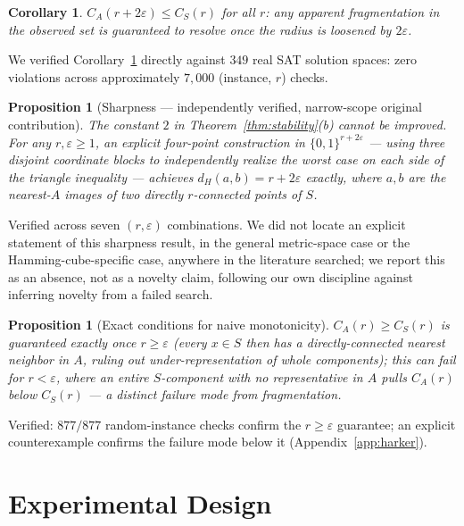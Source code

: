 \documentclass[11pt]{article}
\newtheorem{proposition}[theorem]{Proposition}
\newtheorem{corollary}[theorem]{Corollary}
\theoremstyle{definition}
\theoremstyle{remark}
\newcommand{\dH}{d_H}
\begin{document}
\begin{corollary}
\label{cor:stability}
$C_A(r+2\varepsilon) \le C_S(r)$ for all $r$: any apparent fragmentation in the observed set is guaranteed to resolve once the radius is loosened by $2\varepsilon$.
\end{corollary}

We verified Corollary~\ref{cor:stability} directly against $349$ real SAT solution spaces: zero violations across approximately $7{,}000$ (instance, $r$) checks.

\begin{proposition}[Sharpness --- independently verified, narrow-scope original contribution]
\label{prop:sharpness}
The constant $2$ in Theorem~\ref{thm:stability}(b) cannot be improved. For any $r,\varepsilon \ge 1$, an explicit four-point construction in $\{0,1\}^{r+2\varepsilon}$ --- using three disjoint coordinate blocks to independently realize the worst case on each side of the triangle inequality --- achieves $\dH(a,b) = r+2\varepsilon$ exactly, where $a,b$ are the nearest-$A$ images of two directly $r$-connected points of $S$.
\end{proposition}

Verified across seven $(r,\varepsilon)$ combinations. We did not locate an explicit statement of this sharpness result, in the general metric-space case or the Hamming-cube-specific case, anywhere in the literature searched; we report this as an absence, not as a novelty claim, following our own discipline against inferring novelty from a failed search.

\begin{proposition}[Exact conditions for naive monotonicity]
\label{prop:monotone}
$C_A(r) \ge C_S(r)$ is guaranteed exactly once $r \ge \varepsilon$ (every $x \in S$ then has a directly-connected nearest neighbor in $A$, ruling out under-representation of whole components); this can fail for $r<\varepsilon$, where an entire $S$-component with no representative in $A$ pulls $C_A(r)$ below $C_S(r)$ --- a distinct failure mode from fragmentation.
\end{proposition}

Verified: $877/877$ random-instance checks confirm the $r \ge \varepsilon$ guarantee; an explicit counterexample confirms the failure mode below it (Appendix~\ref{app:harker}).

\section{Experimental Design}
\label{sec:experiment}
\end{document}
